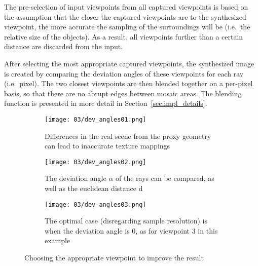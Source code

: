 The pre-selection of input viewpoints from all captured viewpoints is based on the assumption that the closer the captured viewpoints are to the synthesized viewpoint, the more accurate the sampling of the surroundings will be (i.e.\ the relative size of the objects). As a result, all viewpoints further than a certain distance are discarded from the input. \label{misc:input_selection}

After selecting the most appropriate captured viewpoints, the synthesized image is created by comparing the deviation angles of these viewpoints for each ray (i.e.\ pixel). The two closest viewpoints are then blended together on a per-pixel basis, so that there are no abrupt edges between mosaic areas. The blending function is presented in more detail in Section~\ref{sec:impl_details}.

\begin{figure}
\centering
    \hfill
    \begin{subfigure}[t]{0.3\textwidth}            
            \centering
            \texttt{[image: 03/dev\_angles01.png]}
            \caption{Differences in the real scene from the proxy geometry can lead to inaccurate texture mappings}
    \end{subfigure}%
    \hfill
    \begin{subfigure}[t]{0.3\textwidth}
            \centering
            \texttt{[image: 03/dev\_angles02.png]}
            \caption{The deviation angle $\alpha$ of the rays can be compared, as well as the euclidean distance d}
    \end{subfigure}
    \hfill
    \begin{subfigure}[t]{0.3\textwidth}
            \centering
            \texttt{[image: 03/dev\_angles03.png]}
            \caption{The optimal case (disregarding sample resolution) is when the deviation angle is 0, as for viewpoint 3 in this example}
    \end{subfigure}
    \hfill
    \caption[Choosing the appropriate viewpoint for texture lookup]{Choosing the appropriate viewpoint to improve the result} \label{fig:dev_angle}
\end{figure}

